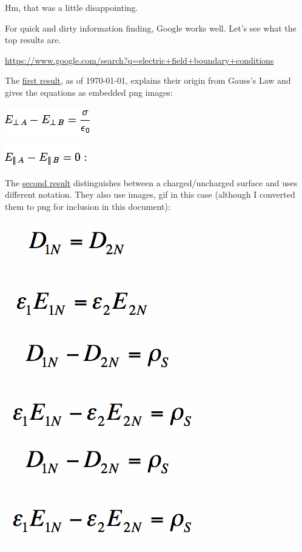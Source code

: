 \documentclass[12pt,letterpaper]{article}
\begin{document}
Hm, that was a little disappointing.

For quick and dirty information finding,
Google works well.
Let's see what the top results are.

\url{https://www.google.com/search?q=electric+field+boundary+conditions}

The
\href{http://farside.ph.utexas.edu/teaching/em/lectures/node59.html}
{first result}, as of \today,
explains their origin from Gauss's Law
and gives the equations as embedded png images:

\begin{center}
\includegraphics[scale=0.5]{img1337.png}

\includegraphics[scale=0.5]{img1344.png}
\end{center}

The
\href{http://www.antenna-theory.com/tutorial/electromagnetics/electric-field-boundary-conditions.php}
{second result} distinguishes between a charged/uncharged surface and uses different notation.
They also use images,
gif in this case
(although I converted them to png for inclusion in this document):
\begin{center}
\includegraphics[scale=0.3]{normalDequal.png}
\includegraphics[scale=0.3]{normalEfieldWithCharge.png}
\includegraphics[scale=0.3]{normalEfieldWithCharge.png}
\end{center}
\end{document}
